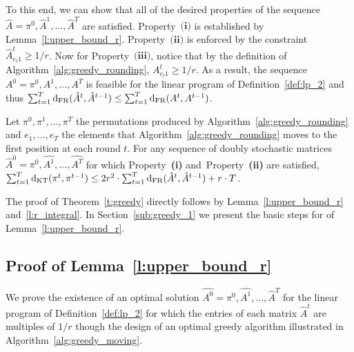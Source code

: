 To this end, we can show that all of the desired properties of the sequence $\hat{A} = \pi^0,\hat{A}^1,\ldots,\hat{A}^T$
are satisfied. Property~$\textbf{(i)}$ is established by Lemma~\ref{l:upper_bound_r}. Property~$\textbf{(ii)}$ is enforced by the constraint $\hat{A}_{e_t 1}^t \geq 1/r$. Now for Property~$\textbf{(iii)}$, notice that by the definition of Algorithm~\ref{alg:greedy_rounding}, $A_{e_t 1}^t \geq 1/r$. As a result, the sequence $A^0=\pi^0,A^1,\ldots,A^T$ is feasible for the linear program of Definition~\ref{def:lp_2} and thus $\sum_{t=1}^T \mathrm{d}_{\mathrm{FR}}(\hat{A}^t,\hat{A}^{t-1}) \leq \sum_{t=1}^T \mathrm{d}_{\mathrm{FR}}(A^t,A^{t-1})$.

\begin{lemma}\label{l:r_integral}
Let $\pi^0,\pi^1,\ldots,\pi^T$ the permutations produced by Algorithm~\ref{alg:greedy_rounding} and $e_1,\ldots,e_T$ the elements that Algorithm~\ref{alg:greedy_rounding} moves to the first position at each round $t$. For any sequence of doubly stochastic matrices $\hat{A}^0 = \pi^0,\hat{A^1},\ldots,\hat{A^T}$ for which Property~\textbf{(i)} and~Property~\textbf{(ii)} are satisfied, $\sum_{t=1}^T \mathrm{d}_{\mathrm{KT}}(\pi^t,\pi^{t-1}) \leq 2r^2 \cdot  \sum_{t=1}^T \mathrm{d}_{\mathrm{FR}}(\hat{A}^t,\hat{A}^{t-1}) + r \cdot T$.
\end{lemma}
\noindent The proof of Theorem~\ref{t:greedy} directly follows by Lemma~\ref{l:upper_bound_r} and~\ref{l:r_integral}. In Section~\ref{sub:greedy_1} we present the basic steps for of Lemma~\ref{l:upper_bound_r}.
\subsection{Proof of Lemma~\ref{l:upper_bound_r}}\label{sub:greedy_2}
We prove the existence of an optimal solution $\hat{A^0} = \pi^0,\hat{A^1},\ldots,\hat{A}^T$ for the linear program of Definition~\ref{def:lp_2} for which the entries of each matrix $\hat{A}^t$ are multiples of $1/r$ though the design of an optimal greedy algorithm illustrated in Algorithm~\ref{alg:greedy_moving}.  

